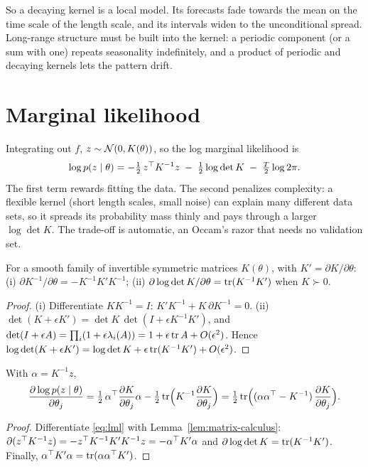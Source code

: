 \documentclass[11pt,a4paper]{article}
\begin{document}
So a decaying kernel is a local model. Its forecasts fade towards the mean
on the time scale of the length scale, and its intervals widen to the
unconditional spread. Long-range structure must be built into the kernel: a
periodic component (or a sum with one) repeats seasonality indefinitely, and a
product of periodic and decaying kernels lets the pattern drift.

\section{Marginal likelihood}\label{sec:ml}

Integrating out $f$, $z\sim\mathcal{N}(0,K(\theta))$, so the log marginal likelihood is
\begin{equation}\label{eq:lml}
  \log p(z\mid\theta) = -\tfrac12\, z^\top K^{-1}z \;-\; \tfrac12\log\det K \;-\; \tfrac T2\log2\pi .
\end{equation}
The first term rewards fitting the data. The second penalizes complexity: a
flexible kernel (short length scales, small noise) can explain many different
data sets, so it spreads its probability mass thinly and pays through a larger
$\log\det K$. The trade-off is automatic, an Occam's razor that needs no
validation set.

\begin{lemma}\label{lem:matrix-calculus}
For a smooth family of invertible symmetric matrices $K(\theta)$, with $K'=\partial K/\partial\theta$:
(i) $\partial K^{-1}/\partial\theta = -K^{-1}K'K^{-1}$;
(ii) $\partial\log\det K/\partial\theta = \operatorname{tr}(K^{-1}K')$ when $K\succ0$.
\end{lemma}
\begin{proof}
(i) Differentiate $KK^{-1}=I$: $K'K^{-1}+K\,\partial K^{-1}=0$.
(ii) $\det(K+\epsilon K')=\det K\,\det(I+\epsilon K^{-1}K')$, and
$\det(I+\epsilon A)=\prod_i(1+\epsilon\lambda_i(A))=1+\epsilon\operatorname{tr} A+O(\epsilon^2)$.
Hence $\log\det(K+\epsilon K')=\log\det K+\epsilon\operatorname{tr}(K^{-1}K')+O(\epsilon^2)$.
\end{proof}

\begin{theorem}\label{thm:gradient}
With $\alpha=K^{-1}z$,
\[
  \frac{\partial\log p(z\mid\theta)}{\partial\theta_j}
  = \tfrac12\,\alpha^\top\frac{\partial K}{\partial\theta_j}\alpha - \tfrac12\operatorname{tr}\!\Big(K^{-1}\frac{\partial K}{\partial\theta_j}\Big)
  = \tfrac12\operatorname{tr}\!\Big((\alpha\alpha^\top-K^{-1})\,\frac{\partial K}{\partial\theta_j}\Big).
\]
\end{theorem}
\begin{proof}
Differentiate \eqref{eq:lml} with Lemma~\ref{lem:matrix-calculus}:
$\partial(z^\top K^{-1}z)=-z^\top K^{-1}K'K^{-1}z=-\alpha^\top K'\alpha$ and
$\partial\log\det K=\operatorname{tr}(K^{-1}K')$. Finally, $\alpha^\top K'\alpha=\operatorname{tr}(\alpha\alpha^\top K')$.
\end{proof}
\end{document}
